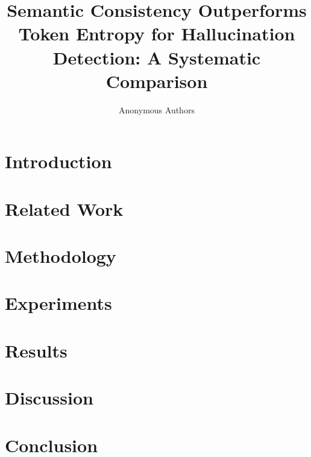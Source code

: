 \documentclass[letterpaper]{article}
\title{Semantic Consistency Outperforms Token Entropy for Hallucination Detection: A Systematic Comparison}
\author{Anonymous Authors}
\date{}
\begin{document}
\maketitle

\begin{abstract}

\end{abstract}

\section{Introduction}


\section{Related Work}


\section{Methodology}


\section{Experiments}


\section{Results}


\section{Discussion}


\section{Conclusion}




\end{document}
